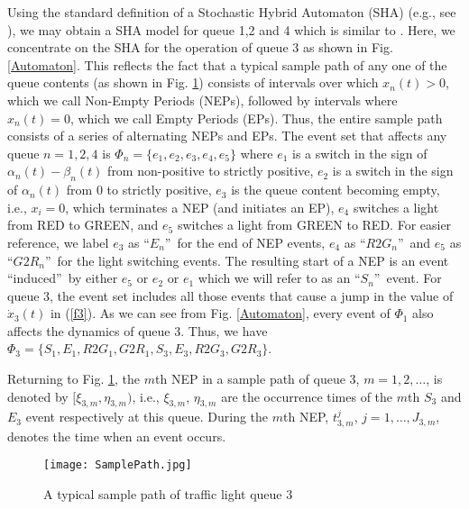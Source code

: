 \documentclass{ifacconf}\usepackage{graphicx}
\begin{document}
Using the standard definition of a Stochastic Hybrid Automaton (SHA) (e.g.,
see \cite{Cassandras08}), we may obtain a SHA model for queue 1,2 and 4 which
is similar to \cite{GengCDC12}. Here, we concentrate on the SHA for the
operation of queue 3 as shown in Fig. \ref{Automaton}. This reflects the fact
that a typical sample path of any one of the queue contents (as shown in Fig.
\ref{SamplePath}) consists of intervals over which $x_{n}(t)>0$, which we call
Non-Empty Periods (NEPs), followed by intervals where $x_{n}(t)=0$, which we
call Empty Periods (EPs). Thus, the entire sample path consists of a series of
alternating NEPs and EPs. The event set that
affects any queue $n=1,2,4$ is $\Phi_{n}=\{e_{1},e_{2},e_{3},e_{4},e_{5}\}$
where $e_{1}$ is a switch in the sign of $\alpha_{n}(t)-\beta_{n}(t)$ from
non-positive to strictly positive, $e_{2}$ is a switch in the sign of
$\alpha_{n}(t)$ from $0$ to strictly positive, $e_{3}$ is the queue content
becoming empty, i.e., $x_{i}=0$, which terminates a NEP (and initiates an EP),
$e_{4}$ switches a light from RED to GREEN, and $e_{5}$ switches a light from
GREEN to RED. For easier reference, we label $e_{3}$ as \textquotedblleft $E_{n}$\textquotedblright\ for the end of NEP events, $e_{4}$ as
\textquotedblleft$R2G_{n}$\textquotedblright\ and $e_{5}$ as \textquotedblleft $G2R_{n}$\textquotedblright\ for the light switching events. The resulting
start of a NEP is an event \textquotedblleft induced\textquotedblright\ by
either $e_{5}$ or $e_{2}$ or $e_{1}$ which we will refer to as an
\textquotedblleft$S_{n}$\textquotedblright\ event. For queue 3, the event set
includes all those events that cause a jump in the value of $\dot{x}_{3}(t)$
in (\ref{f3}). As we can see from Fig. \ref{Automaton}, every event of
$\Phi_{1}$ also affects the dynamics of queue 3. Thus, we have $\Phi
_{3}=\{S_{1},E_{1},R2G_{1},G2R_{1},S_{3},E_{3},R2G_{3},G2R_{3}\}$.

Returning to Fig. \ref{SamplePath}, the $m$th NEP in a sample path of queue 3,
$m=1,2,\ldots$, is denoted by $[\xi_{3,m},\eta_{3,m})$, i.e., $\xi_{3,m}$,
$\eta_{3,m}$ are the occurrence times of the $m$th $S_{3}$ and $E_{3}$ event
respectively at this queue. During the $m$th NEP, $t_{3,m}^{j}$,
$j=1,\ldots,J_{3,m}$, denotes the time when an event occurs.

\begin{figure}[tbh]
\centering
\texttt{[image: SamplePath.jpg]}\caption{A typical sample path of
traffic light queue 3}\label{SamplePath}\end{figure}
\end{document}
